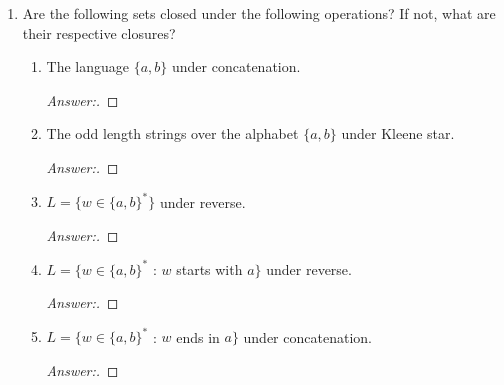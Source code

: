 \documentclass[10pt]{article}
\begin{document}
\begin{enumerate}
\begin{enumerate}
\item
$L = \{w \in \{a, b\}^*$ : $\exists x \in \{a, b\}^+ (w = axa)\}$.
\begin{proof}[Answer:]
\end{proof}
\end{enumerate}


\item
Are the following sets closed under the following operations?  If not, what are their respective closures?
\begin{enumerate}

\item
The language $\{a, b\}$ under concatenation.
\begin{proof}[Answer:]
\end{proof}

\item
The odd length strings over the alphabet $\{a, b\}$ under Kleene star.
\begin{proof}[Answer:]
\end{proof}

\item
$L = \{w \in \{a, b\}^*\}$ under reverse.
\begin{proof}[Answer:]
\end{proof}

\item
$L = \{w \in \{a, b\}^*$ : $w$ starts with $a\}$ under reverse.
\begin{proof}[Answer:]
\end{proof}

\item
$L = \{w \in \{a, b\}^*$ : $w$ ends in $a\}$ under concatenation.
\begin{proof}[Answer:]
\end{proof}
\end{enumerate}
\end{enumerate}
 
\end{document}
